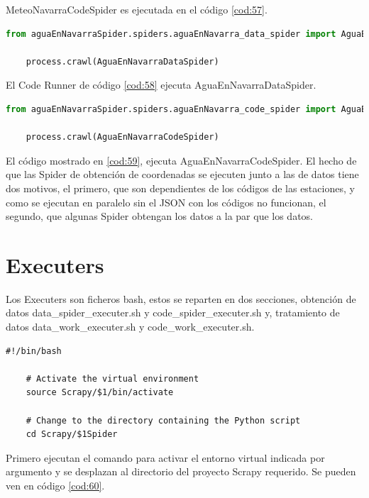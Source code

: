 MeteoNavarraCodeSpider es ejecutada en el código \ref{cod:57}.

\begin{lstlisting}[language=Python, caption={Agua en Navarra Data Runner}, label=cod:58]
	from aguaEnNavarraSpider.spiders.aguaEnNavarra_data_spider import AguaEnNavarraDataSpider
	
	process.crawl(AguaEnNavarraDataSpider)
\end{lstlisting}

El Code Runner de código \ref{cod:58} ejecuta AguaEnNavarraDataSpider.

\begin{lstlisting}[language=Python, caption={Agua en Navarra Code Runner}, label=cod:59]
	from aguaEnNavarraSpider.spiders.aguaEnNavarra_code_spider import AguaEnNavarraCodeSpider

	process.crawl(AguaEnNavarraCodeSpider)
\end{lstlisting}

El código mostrado en \ref{cod:59}, ejecuta AguaEnNavarraCodeSpider.\newline
\newline
El hecho de que las Spider de obtención de coordenadas se ejecuten junto a las de datos tiene dos motivos, el primero, que son dependientes de los códigos de las estaciones, y como se ejecutan en paralelo sin el JSON con los códigos no funcionan, el segundo, que algunas Spider obtengan los datos a la par que los datos.

\section{Executers}
Los Executers son ficheros bash, estos se reparten en dos secciones, obtención de datos data\_spider\_executer.sh y code\_spider\_executer.sh y, tratamiento de datos data\_work\_executer.sh y code\_work\_executer.sh.

\begin{lstlisting}[caption={Ejecucion de entorno virtual y selección de proyecto Scrapy}, label=cod:60]
	#!/bin/bash
	
	# Activate the virtual environment
	source Scrapy/$1/bin/activate
	
	# Change to the directory containing the Python script
	cd Scrapy/$1Spider
\end{lstlisting}

Primero ejecutan el comando para activar el entorno virtual indicada por argumento y se desplazan al directorio del proyecto Scrapy requerido. Se pueden ven en código \ref{cod:60}.


